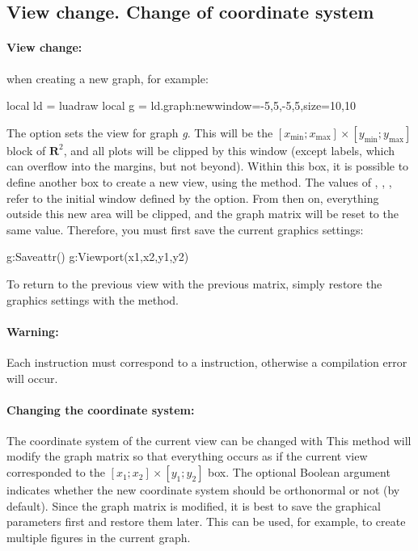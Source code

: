 \subsection{View change. Change of coordinate system}

\paragraph{View change: } when creating a new graph, for example:
\begin{Luacode}
local ld = luadraw
local g = ld.graph:new{window={-5,5,-5,5},size={10,10}}
\end{Luacode}
The option  sets the view for graph \emph{g}. This will be the $[x_{\mathrm{min}}; x_{\mathrm{max}}]\times [y_{\mathrm{min}}; y_{\mathrm{max}}]$ block of $\mathbf R^2$, and all plots will be clipped by this window (except labels, which can overflow into the margins, but not beyond). Within this box, it is possible to define another box to create a new view, using the  method. The values ​​of , , ,  refer to the initial window defined by the  option. From then on, everything outside this new area will be clipped, and the graph matrix will be reset to the same value. Therefore, you must first save the current graphics settings:
\begin{Luacode}
g:Saveattr()
g:Viewport(x1,x2,y1,y2)
\end{Luacode}
To return to the previous view with the previous matrix, simply restore the graphics settings with the  method.

\paragraph{Warning: } Each  instruction must correspond to a  instruction, otherwise a compilation error will occur.

\paragraph{Changing the coordinate system: } The coordinate system of the current view can be changed with 
 This method will modify the graph matrix so that everything occurs as if the current view corresponded to the $[x_1;x_2]\times[y_1;y_2]$ box. The optional Boolean argument  indicates whether the new coordinate system should be orthonormal or not (\false by default). Since the graph matrix is ​​modified, it is best to save the graphical parameters first and restore them later. This can be used, for example, to create multiple figures in the current graph.

